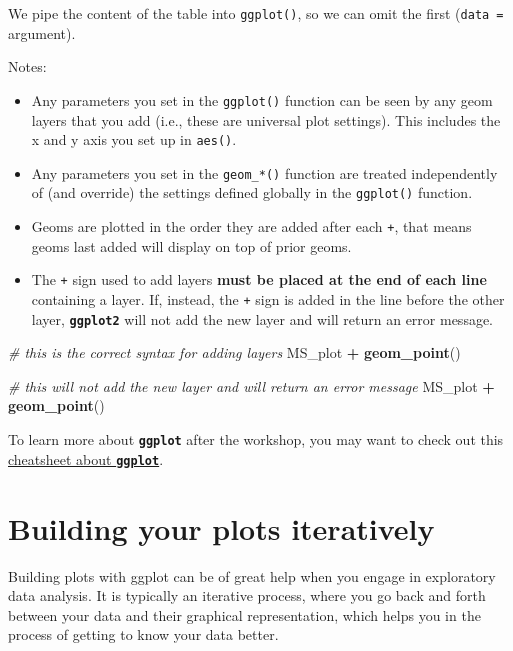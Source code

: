 \documentclass[]{book}
\newenvironment{Shaded}{\begin{snugshade}}{\end{snugshade}}
\newcommand{\CommentTok}[1]{\textcolor[rgb]{0.56,0.35,0.01}{\textit{#1}}}
\newcommand{\KeywordTok}[1]{\textcolor[rgb]{0.13,0.29,0.53}{\textbf{#1}}}
\newcommand{\NormalTok}[1]{#1}
\newcommand{\OperatorTok}[1]{\textcolor[rgb]{0.81,0.36,0.00}{\textbf{#1}}}
\newcommand{\StringTok}[1]{\textcolor[rgb]{0.31,0.60,0.02}{#1}}
\providecommand{\tightlist}{%
  \setlength{\itemsep}{0pt}\setlength{\parskip}{0pt}}
\begin{document}
We pipe the content of the table into \texttt{ggplot()}, so we can omit the first (\texttt{data\ =} argument).

Notes:

\begin{itemize}
\tightlist
\item
  Any parameters you set in the \texttt{ggplot()} function can be seen by any geom layers
  that you add (i.e., these are universal plot settings). This includes the x and y axis you set up in \texttt{aes()}.
\item
  Any parameters you set in the \texttt{geom\_*()} function are treated independently of (and override) the settings defined globally in the \texttt{ggplot()} function.
\item
  Geoms are plotted in the order they are added after each \texttt{+}, that means geoms last added will display on top of prior geoms.
\item
  The \texttt{+} sign used to add layers \textbf{must be placed at the end of each line} containing
  a layer. If, instead, the \texttt{+} sign is added in the line before the other layer,
  \textbf{\texttt{ggplot2}} will not add the new layer and will return an error message.
\end{itemize}

\begin{Shaded}
\begin{Highlighting}[]
\CommentTok{# this is the correct syntax for adding layers}
\NormalTok{MS_plot }\OperatorTok{+}
\StringTok{  }\KeywordTok{geom_point}\NormalTok{()}

\CommentTok{# this will not add the new layer and will return an error message}
\NormalTok{MS_plot}
  \OperatorTok{+}\StringTok{ }\KeywordTok{geom_point}\NormalTok{()}
\end{Highlighting}
\end{Shaded}

To learn more about \textbf{\texttt{ggplot}} after the workshop, you may want to check out this \href{https://www.rstudio.com/wp-content/uploads/2016/11/ggplot2-cheatsheet-2.1.pdf}{cheatsheet about \textbf{\texttt{ggplot}}}.

\hypertarget{building-your-plots-iteratively}{%
\section{Building your plots iteratively}\label{building-your-plots-iteratively}}

Building plots with ggplot can be of great help when you engage in exploratory data analysis. It is typically an iterative process, where you go back and forth between your data and their graphical representation, which helps you in the process of getting to know your data better.
\end{document}
